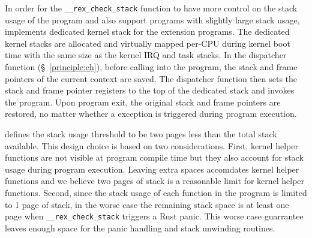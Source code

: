In order for the \texttt{\_\_rex\_check\_stack} function to have more control
    on the stack usage of the program and also support programs with slightly
    large stack usage, \projname{} implements dedicated kernel stack for the
    extension programs.
The dedicated kernel stacks are allocated and virtually mapped per-CPU during
    kernel boot time with the same size as the kernel IRQ and task stacks.
In the dispatcher function (\S~\ref{principle:eh}), before calling into the
    \projname{} program, the stack and frame pointers of the current context
    are saved.
The dispatcher function then sets the stack and frame pointer registers to the
    top of the dedicated stack and invokes the program.
Upon program exit, the original stack and frame pointers are restored, no
    matter whether a exception is triggered during program execution.


\projname{} defines the stack usage threshold to be two pages less than the
    total stack available.
This design choice is based on two considerations.
First, kernel helper functions are not visible at program compile time but they
    also account for stack usage during program execution.
Leaving extra spaces accomdates kernel helper functions and we believe two
    pages of stack is a reasonable limit for kernel helper functions.
Second, since the stack usage of each function in the program is limited to
    1 page of stack, in the worse case the remaining stack space is at least
    one page when \texttt{\_\_rex\_check\_stack} triggers a Rust panic.
This worse case guarrantee leaves enough space for the panic handling and stack
    unwinding routines.